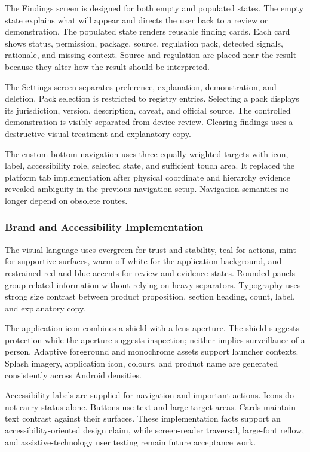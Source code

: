 The Findings screen is designed for both empty and populated states. The empty state explains what will appear and directs the user back to a review or demonstration. The populated state renders reusable finding cards. Each card shows status, permission, package, source, regulation pack, detected signals, rationale, and missing context. Source and regulation are placed near the result because they alter how the result should be interpreted.

The Settings screen separates preference, explanation, demonstration, and deletion. Pack selection is restricted to registry entries. Selecting a pack displays its jurisdiction, version, description, caveat, and official source. The controlled demonstration is visibly separated from device review. Clearing findings uses a destructive visual treatment and explanatory copy.

The custom bottom navigation uses three equally weighted targets with icon, label, accessibility role, selected state, and sufficient touch area. It replaced the platform tab implementation after physical coordinate and hierarchy evidence revealed ambiguity in the previous navigation setup. Navigation semantics no longer depend on obsolete routes.

\subsubsection{Brand and Accessibility Implementation}

The visual language uses evergreen for trust and stability, teal for actions, mint for supportive surfaces, warm off-white for the application background, and restrained red and blue accents for review and evidence states. Rounded panels group related information without relying on heavy separators. Typography uses strong size contrast between product proposition, section heading, count, label, and explanatory copy.

The application icon combines a shield with a lens aperture. The shield suggests protection while the aperture suggests inspection; neither implies surveillance of a person. Adaptive foreground and monochrome assets support launcher contexts. Splash imagery, application icon, colours, and product name are generated consistently across Android densities.

Accessibility labels are supplied for navigation and important actions. Icons do not carry status alone. Buttons use text and large target areas. Cards maintain text contrast against their surfaces. These implementation facts support an accessibility-oriented design claim, while screen-reader traversal, large-font reflow, and assistive-technology user testing remain future acceptance work.


